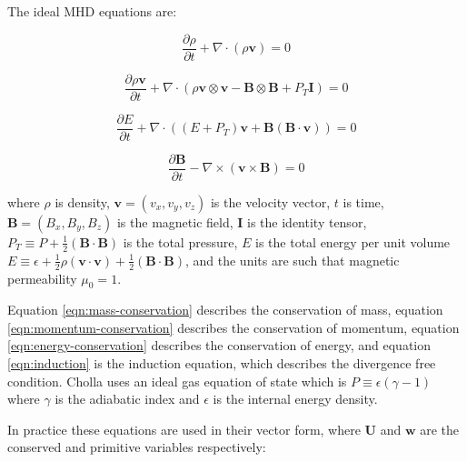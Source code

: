 The ideal MHD equations are:

\begin{equation}
    \label{eqn:mass-conservation}
    \frac{\partial \rho}{\partial t} + \nabla \cdot (\rho \boldsymbol{v}) = 0
\end{equation}

\begin{equation}
    \label{eqn:momentum-conservation}
    \frac{\partial \rho\boldsymbol{v}}{\partial t} + \nabla \cdot (\rho \boldsymbol{v}\otimes\boldsymbol{v} - \boldsymbol{B}\otimes\boldsymbol{B} + P_T\boldsymbol{I}) = 0
\end{equation}

\begin{equation}
    \label{eqn:energy-conservation}
    \frac{\partial E}{\partial t} + \nabla \cdot ( (E + P_T) \boldsymbol{v} + \boldsymbol{B}(\boldsymbol{B}\cdot\boldsymbol{v}) ) = 0
\end{equation}

\begin{equation}
    \label{eqn:induction}
    \frac{\partial \boldsymbol{B}}{\partial t} - \nabla \times (\boldsymbol{v} \times \boldsymbol{B}) = 0
\end{equation}

\noindent where $\rho$ is density, $\boldsymbol{v} = ( v_x, v_y, v_z)$ is the velocity vector, $t$ is time, $\boldsymbol{B} = ( B_x, B_y, B_z)$ is the magnetic field, $\boldsymbol{I}$ is the identity tensor, $P_T \equiv P + \frac{1}{2}(\boldsymbol{B} \cdot \boldsymbol{B})$ is the total pressure, $E$ is the total energy per unit volume $E \equiv \epsilon + \frac{1}{2}\rho(\boldsymbol{v}\cdot\boldsymbol{v}) + \frac{1}{2}(\boldsymbol{B}\cdot\boldsymbol{B})$, and the units are such that magnetic permeability $\mu_0 = 1$. 

Equation \ref{eqn:mass-conservation} describes the conservation of mass, equation \ref{eqn:momentum-conservation} describes the conservation of momentum, equation \ref{eqn:energy-conservation} describes the conservation of energy, and equation \ref{eqn:induction} is the induction equation, which describes the divergence free condition. Cholla uses an ideal gas equation of state  which is $P \equiv \epsilon(\gamma - 1)$ where $\gamma$ is the adiabatic index and $\epsilon$ is the internal energy density. 

In practice these equations are used in their vector form, where $\boldsymbol{U}$ and $\boldsymbol{w}$ are the conserved and primitive variables respectively:

